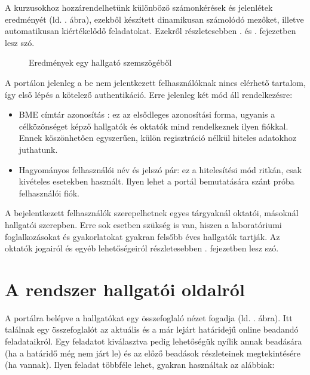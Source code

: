     A kurzusokhoz hozzárendelhetünk különböző számonkérések és jelenlétek eredményét (ld. . ábra), ezekből készített dinamikusan számolódó mezőket, illetve automatikusan kiértékelődő feladatokat. Ezekről részletesebben . és . fejezetben lesz szó.

    \begin{figure}[h]
        \centering
        \caption{Eredmények egy hallgató szemszögéből}
        \label{fig:jporta_results}
    \end{figure} 

    A portálon jelenleg a be nem jelentkezett felhasználóknak nincs elérhető tartalom, így első lépés a kötelező authentikáció. Erre jelenleg két mód áll rendelkezésre:

    \begin{itemize}
        \item BME címtár azonosítás \cite{BMECimtar}: ez az elsődleges azonosítási forma, ugyanis a célközönséget képző hallgatók és oktatók mind rendelkeznek ilyen fiókkal. Ennek köszönhetően egyszerűen, külön regisztráció nélkül hiteles adatokhoz juthatunk.
        \item Hagyományos felhasználói név és jelszó pár: ez a hitelesítési mód ritkán, csak kivételes esetekben használt. Ilyen lehet a portál bemutatására szánt próba felhasználói fiók.
    \end{itemize}

    A bejelentkezett felhasználók szerepelhetnek egyes tárgyaknál oktatói, másoknál hallgatói szerepben. Erre sok esetben szükség is van, hiszen a laboratóriumi foglalkozásokat és gyakorlatokat gyakran felsőbb éves hallgatók tartják. Az oktatók jogairól és egyéb lehetőségeiról részletesebben . fejezetben lesz szó.
     
\section{A rendszer hallgatói oldalról}
    A portálra belépve a hallgatókat egy összefoglaló nézet fogadja (ld. . ábra). Itt találnak egy összefoglalót az aktuális és a már lejárt határidejű online beadandó feladataikról. Egy feladatot kiválasztva pedig lehetőségük nyílik annak beadására (ha a határidő még nem járt le) és az előző beadások részleteinek megtekintésére (ha vannak). Ilyen feladat többféle lehet, gyakran használtak az alábbiak:

